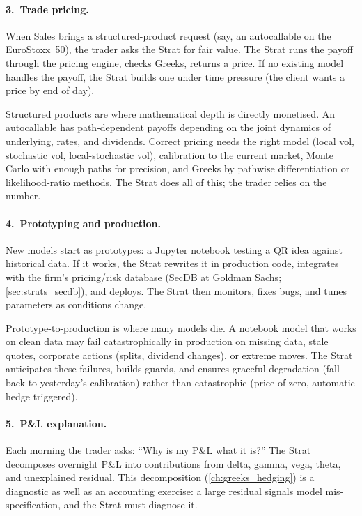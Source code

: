 \paragraph{3.\ Trade pricing.}
When Sales brings a structured-product request (say, an
autocallable on the EuroStoxx~50), the trader asks the Strat for
fair value.  The Strat runs the payoff through the pricing engine,
checks Greeks, returns a price.  If no existing model handles the
payoff, the Strat builds one under time pressure (the client wants
a price by end of day).

Structured products are where mathematical depth is directly
monetised.  An autocallable has path-dependent payoffs depending on
the joint dynamics of underlying, rates, and dividends.  Correct
pricing needs the right model (local vol, stochastic vol,
local-stochastic vol), calibration to the current market, Monte
Carlo with enough paths for precision, and Greeks by pathwise
differentiation or likelihood-ratio methods.  The Strat does all of
this; the trader relies on the number.

\paragraph{4.\ Prototyping and production.}
New models start as prototypes: a Jupyter notebook testing a QR idea
against historical data.  If it works, the Strat rewrites it in
production code, integrates with the firm's pricing/risk database
(SecDB at Goldman Sachs; \cref{sec:strats_secdb}), and deploys.  The
Strat then monitors, fixes bugs, and tunes parameters as conditions
change.

Prototype-to-production is where many models die.  A notebook model
that works on clean data may fail catastrophically in production on
missing data, stale quotes, corporate actions (splits, dividend
changes), or extreme moves.  The Strat anticipates these failures,
builds guards, and ensures graceful degradation (fall back to
yesterday's calibration) rather than catastrophic (price of zero,
automatic hedge triggered).

\paragraph{5.\ P\&L explanation.}
Each morning the trader asks: ``Why is my P\&L what it is?''  The
Strat decomposes overnight P\&L into contributions from delta, gamma,
vega, theta, and unexplained residual.  This decomposition
(\cref{ch:greeks_hedging}) is a diagnostic as well as an accounting
exercise: a large residual signals model mis-specification, and the
Strat must diagnose it.

